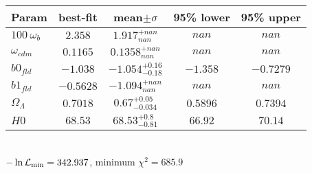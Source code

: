 \begin{tabular}{|l|c|c|c|c|} 
 \hline 
Param & best-fit & mean$\pm\sigma$ & 95\% lower & 95\% upper \\ \hline 
$100~\omega_{b }$ &$2.358$ & $1.917_{nan}^{+nan}$ & $nan$ & $nan$ \\ 
$\omega_{cdm }$ &$0.1165$ & $0.1358_{nan}^{+nan}$ & $nan$ & $nan$ \\ 
$b0_{fld }$ &$-1.038$ & $-1.054_{-0.18}^{+0.16}$ & $-1.358$ & $-0.7279$ \\ 
$b1_{fld }$ &$-0.5628$ & $-1.094_{nan}^{+nan}$ & $nan$ & $nan$ \\ 
$\Omega_{\Lambda }$ &$0.7018$ & $0.67_{-0.034}^{+0.05}$ & $0.5896$ & $0.7394$ \\ 
$H0$ &$68.53$ & $68.53_{-0.81}^{+0.8}$ & $66.92$ & $70.14$ \\ 
\hline 
 \end{tabular} \\ 
$-\ln{\cal L}_\mathrm{min} =342.937$, minimum $\chi^2=685.9$ \\ 
